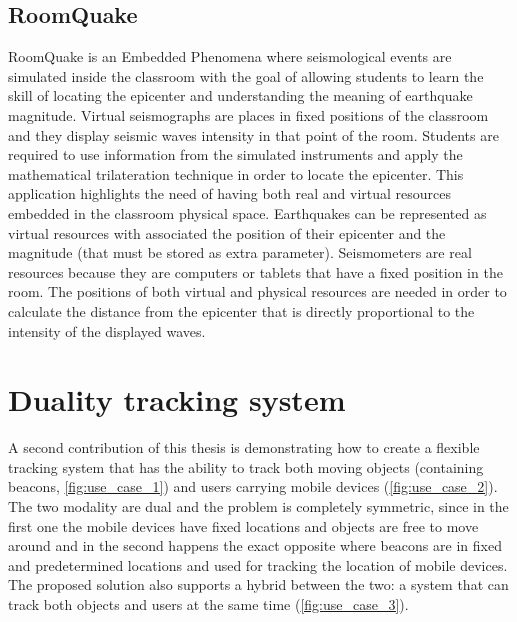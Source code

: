 \subsection{RoomQuake}
RoomQuake \cite{moher:roomquake} is an Embedded Phenomena \cite{moher:embedded} where seismological events are simulated inside the classroom with the goal of allowing students to learn the skill of locating the epicenter and understanding the meaning of earthquake magnitude. Virtual seismographs are places in fixed positions of the classroom and they display seismic waves intensity in that point of the room. Students are required to use information from the simulated instruments and apply the mathematical trilateration technique in order to locate the epicenter. This application highlights the need of having both real and virtual resources embedded in the classroom physical space. Earthquakes can be represented as virtual resources with associated the position of their epicenter and the magnitude (that must be stored as extra parameter). Seismometers are real resources because they are computers or tablets that have a fixed position in the room. The positions of both virtual and physical resources are needed in order to calculate the distance from the epicenter that is directly proportional to the intensity of the displayed waves.


\section{Duality tracking system}
A second contribution of this thesis is demonstrating how to create a flexible tracking system that has the ability to track both moving objects (containing beacons, \ref{fig:use_case_1}) and users carrying mobile devices (\ref{fig:use_case_2}). The two modality are dual and the problem is completely symmetric, since in the first one the mobile devices have fixed locations and objects are free to move around and in the second happens the exact opposite where beacons are in fixed and predetermined locations and used for tracking the location of mobile devices. The proposed solution also supports a hybrid between the two: a system that can track both objects and users at the same time (\ref{fig:use_case_3}).

